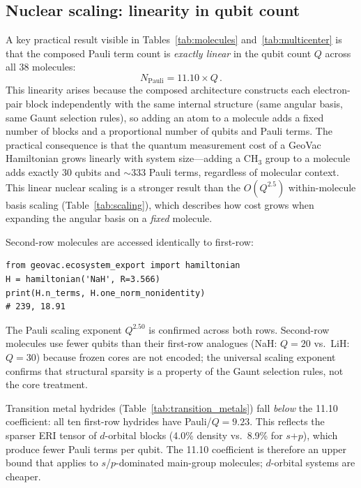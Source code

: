 \documentclass[twocolumn,pra,amsmath,amssymb,superscriptaddress]{revtex4-2}
\begin{document}
\subsection{Nuclear scaling: linearity in qubit count}

A key practical result visible in Tables~\ref{tab:molecules}
and~\ref{tab:multicenter} is that the composed Pauli term count is
\emph{exactly linear} in the qubit count $Q$ across all 38 molecules:
\begin{equation}
  N_{\text{Pauli}} = 11.10 \times Q\,.
  \label{eq:linear}
\end{equation}
This linearity arises because the composed architecture constructs
each electron-pair block independently with the same internal structure
(same angular basis, same Gaunt selection rules), so adding an atom
to a molecule adds a fixed number of blocks and a proportional number
of qubits and Pauli terms.  The practical consequence is that the
quantum measurement cost of a GeoVac Hamiltonian grows linearly with
system size---adding a CH$_3$ group to a molecule adds exactly 30
qubits and $\sim$333 Pauli terms, regardless of molecular context.
This linear nuclear scaling is a stronger result than the
$O(Q^{2.5})$ within-molecule basis scaling (Table~\ref{tab:scaling}),
which describes how cost grows when expanding the angular basis on a
\emph{fixed} molecule.

Second-row molecules are accessed identically to first-row:
\begin{lstlisting}
from geovac.ecosystem_export import hamiltonian
H = hamiltonian('NaH', R=3.566)
print(H.n_terms, H.one_norm_nonidentity)
# 239, 18.91
\end{lstlisting}

\noindent The Pauli scaling exponent $Q^{2.50}$ is confirmed across both
rows.  Second-row molecules use fewer qubits than their first-row
analogues (NaH: $Q=20$ vs.\ LiH: $Q=30$) because frozen cores are
not encoded; the universal scaling exponent confirms that structural
sparsity is a property of the Gaunt selection rules, not the core
treatment.

Transition metal hydrides (Table~\ref{tab:transition_metals}) fall
\emph{below} the 11.10 coefficient: all ten first-row hydrides have
Pauli/$Q = 9.23$.  This reflects the sparser ERI tensor of $d$-orbital
blocks (4.0\% density vs.\ 8.9\% for $s$+$p$), which produce fewer
Pauli terms per qubit.  The 11.10 coefficient is therefore an upper
bound that applies to $s$/$p$-dominated main-group molecules;
$d$-orbital systems are cheaper.
\end{document}
